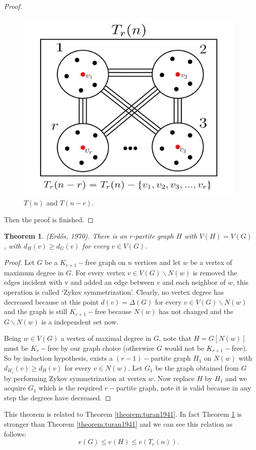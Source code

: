 \documentclass[12pt,twoside,a4paper]{book}
\numberwithin{equation}{section}
\let\setminus=\smallsetminus
\newtheorem{theorem}             {Theorem}[section]
\theoremstyle{remark}
\begin{document}
\begin{proof}
 \begin{figure}[H]
     \centering
     \includegraphics[scale=1]{Figuras/t(n)-and-t(n-r)}
     \caption{$T(n)$ and $T(n-r)$.}
     \label{fig:t(n)-and-t(n-r)}
\end{figure}
Then the proof is finished.
\end{proof}

\begin{theorem}\label{theorem:erdos1970} (Erd\H{o}s, 1970). There is an $ r$-partite graph $H$ with $V(H) = V(G)$, with $d_H(v) \geq d_G(v)$ for every $v \in V(G)$.\\
\end{theorem}

\begin{proof}
 Let $G$ be a $ K_{r+1}-$free graph on $n$ vertices and let $w$ be a vertex of maximum degree in $G$. For every vertex $v \in V(G)\setminus N(w)$ is removed the edges incident with v and added an edge between $v$ and each neighbor of $w$, this operation is called `Zykov symmetrization'. Clearly, no vertex degree has decreased because at this point $d(v) = \Delta(G)$ for every $v \in V(G)\setminus N(w)$ and the graph is still $K_{r+1}-$free because $N(w)$ has not changed and the $G\setminus N(w)$ is a independent set now.

Being $w\in V(G)$ a vertex of maximal degree in $G$, note that $H=G[N(w)]$ must be $K_r-$free by our graph choice (otherwise $G$ would not be $K_{r+1}-$free). So by induction hypothesis, exists a $(r-1)-$partite graph $H_1$ on $N(w)$ with $d_{H_1}(v) \geq d_{H}(v)$ for every $v \in N(w)$. Let $G_1$ be the graph obtained from $G$ by performing Zykov symmetrization at vertex $w$. Now replace $H$ by $H_1$ and we acquire $G_1$ which is the required $r-$partite graph, note it is valid because in any step the degrees have decreased.
\end{proof}
This theorem is related to Theorem \ref{theorem:turan1941}. In fact Theorem \ref{theorem:erdos1970} is stronger than Theorem \ref{theorem:turan1941} and we can see this relation as follows: $$e(G) \leq e(H) \leq e(T_r(n)).$$
\end{document}
